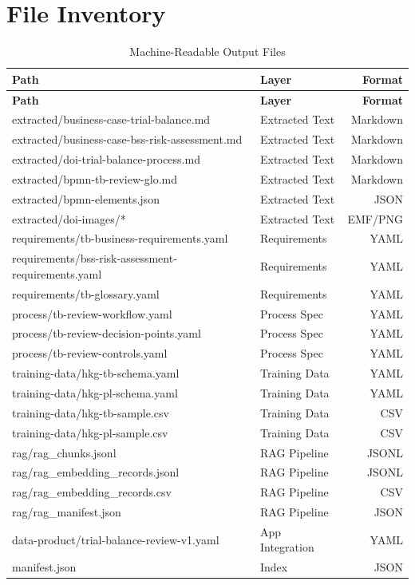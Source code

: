 \documentclass[11pt,a4paper]{article}
\begin{document}
\newpage
\appendix
\section{File Inventory}
\label{app:files}

\begin{longtable}{p{8.5cm}p{4cm}r}
\caption{Machine-Readable Output Files} \\
\toprule
\textbf{Path} & \textbf{Layer} & \textbf{Format} \\
\midrule
\endfirsthead
\toprule
\textbf{Path} & \textbf{Layer} & \textbf{Format} \\
\midrule
\endhead
extracted/business-case-trial-balance.md   & Extracted Text & Markdown \\
extracted/business-case-bss-risk-assessment.md & Extracted Text & Markdown \\
extracted/doi-trial-balance-process.md     & Extracted Text & Markdown \\
extracted/bpmn-tb-review-glo.md            & Extracted Text & Markdown \\
extracted/bpmn-elements.json               & Extracted Text & JSON \\
extracted/doi-images/*                     & Extracted Text & EMF/PNG \\
\midrule
requirements/tb-business-requirements.yaml   & Requirements & YAML \\
requirements/bss-risk-assessment-requirements.yaml & Requirements & YAML \\
requirements/tb-glossary.yaml              & Requirements & YAML \\
\midrule
process/tb-review-workflow.yaml            & Process Spec & YAML \\
process/tb-review-decision-points.yaml     & Process Spec & YAML \\
process/tb-review-controls.yaml            & Process Spec & YAML \\
\midrule
training-data/hkg-tb-schema.yaml           & Training Data & YAML \\
training-data/hkg-pl-schema.yaml           & Training Data & YAML \\
training-data/hkg-tb-sample.csv            & Training Data & CSV \\
training-data/hkg-pl-sample.csv            & Training Data & CSV \\
\midrule
rag/rag\_chunks.jsonl                      & RAG Pipeline & JSONL \\
rag/rag\_embedding\_records.jsonl          & RAG Pipeline & JSONL \\
rag/rag\_embedding\_records.csv            & RAG Pipeline & CSV \\
rag/rag\_manifest.json                     & RAG Pipeline & JSON \\
\midrule
data-product/trial-balance-review-v1.yaml  & App Integration & YAML \\
manifest.json                              & Index & JSON \\
\bottomrule
\end{longtable}
\end{document}

